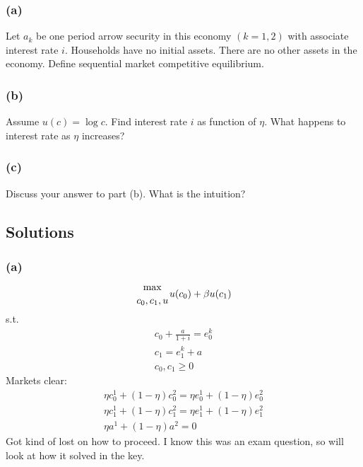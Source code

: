 \documentclass[10pt, a4paper]{article}
\begin{document}
    \subsubsection*{(a)}
      Let $a_k$ be one period arrow security in this economy $(k = 1,2)$ with associate interest rate $i$. Households have no initial assets. There are no other assets in the economy. Define sequential market competitive equilibrium.
    \subsubsection*{(b)}
      Assume $u(c) = \log c$. Find interest rate $i$ as function of $\eta$. What happens to interest rate as $\eta$ increases?
    \subsubsection*{(c)}
      Discuss your answer to part (b). What is the intuition?
  \subsection*{Solutions}
    \subsubsection*{(a)}
      \begin{gather*}
        {\max\atop{c_0,c_1,u}}u(c_0)+\beta u(c_1) \\
      \end{gather*}
      s.t.
      \begin{gather*}
        c_0 + \frac{a}{1+i} = e_0^k \\
        c_1 = e_1^k + a \\
        c_0,c_1\geq 0
      \end{gather*}
      Markets clear:
      \begin{gather*}
        \eta c_0^1 + (1-\eta)c_0^2 = \eta e_0^1 + (1-\eta)e_0^2 \\
        \eta c_1^1 + (1-\eta)c_1^2 = \eta e_1^1 + (1-\eta)e_1^2 \\
        \eta a^1 + (1-\eta) a^2 = 0
      \end{gather*}
  Got kind of lost on how to proceed. I know this was an exam question, so will look at how it solved in the key.
\end{document}
